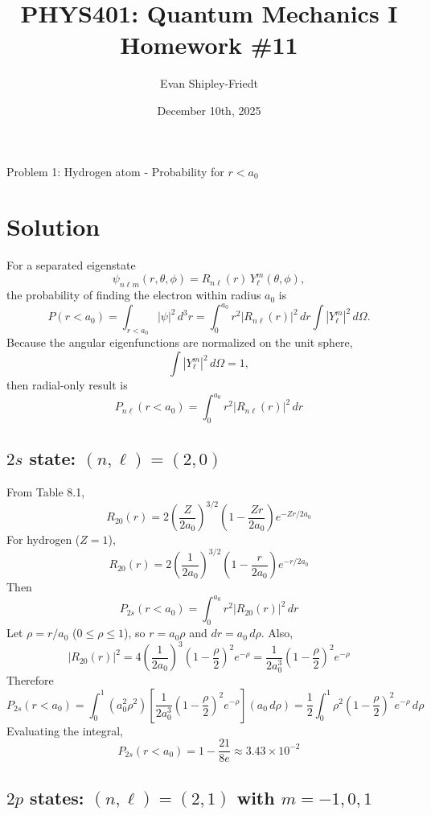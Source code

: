 \documentclass{article}
\title{PHYS401: Quantum Mechanics I \\ Homework \#11}
\author{Evan Shipley-Friedt}
\date{December 10th, 2025}
\begin{document}
\maketitle

{\huge Problem 1: Hydrogen atom - Probability for $r<a_0$}

\section*{Solution}

For a separated eigenstate
\[
\psi_{n\ell m}(r,\theta,\phi)=R_{n\ell}(r)\,Y_\ell^m(\theta,\phi),
\]
the probability of finding the electron within radius $a_0$ is
\[
P(r<a_0)=\int_{r<a_0}|\psi|^2\,d^3r
=\int_0^{a_0} r^2 |R_{n\ell}(r)|^2\,dr \int |Y_\ell^m|^2\,d\Omega.
\]
Because the angular eigenfunctions are normalized on the unit sphere,
\[
\int |Y_\ell^m|^2\,d\Omega=1,
\]
then radial-only result is
\[
\boxed{
P_{n\ell}(r<a_0)=\int_0^{a_0} r^2 |R_{n\ell}(r)|^2\,dr
}
\]


\subsection*{$2s$ state: $(n,\ell)=(2,0)$}

From Table 8.1,
\[
R_{20}(r)=2\left(\frac{Z}{2a_0}\right)^{3/2}\left(1-\frac{Zr}{2a_0}\right)e^{-Zr/2a_0}
\]
For hydrogen ($Z=1$),
\[
R_{20}(r)=2\left(\frac{1}{2a_0}\right)^{3/2}\left(1-\frac{r}{2a_0}\right)e^{-r/2a_0}
\]
Then
\[
P_{2s}(r<a_0)=\int_0^{a_0} r^2 |R_{20}(r)|^2\,dr
\]
Let $\rho=r/a_0$ ($0\le\rho\le 1$), so $r=a_0\rho$ and $dr=a_0\,d\rho$.  Also,
\[
|R_{20}(r)|^2
=4\left(\frac{1}{2a_0}\right)^3\left(1-\frac{\rho}{2}\right)^2e^{-\rho}
=\frac{1}{2a_0^3}\left(1-\frac{\rho}{2}\right)^2e^{-\rho}
\]
Therefore
\[
P_{2s}(r<a_0)=\int_0^1 \left(a_0^2\rho^2\right)\left[\frac{1}{2a_0^3}\left(1-\frac{\rho}{2}\right)^2e^{-\rho}\right]\left(a_0\,d\rho\right)
=\frac{1}{2}\int_0^1 \rho^2\left(1-\frac{\rho}{2}\right)^2 e^{-\rho}\,d\rho
\]
Evaluating the integral,
\[
\boxed{
P_{2s}(r<a_0)=1-\frac{21}{8e}\approx 3.43\times 10^{-2}
}
\]


\subsection*{$2p$ states: $(n,\ell)=(2,1)$ with $m=-1,0,1$}
\end{document}
